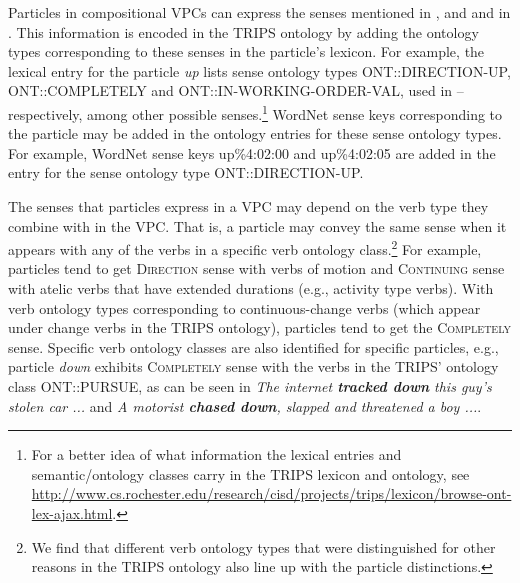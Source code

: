 \documentclass[output=paper
,modfonts
,nonflat]{langsci/langscibook}
\begin{document}
Particles in compositional VPCs can express the senses mentioned in , and  and in . This information is encoded in the TRIPS ontology by adding the ontology types corresponding to these senses in the particle's lexicon. For example, the lexical entry for the particle \textit{up} lists sense ontology types ONT::DIRECTION-UP, ONT::COMPLETELY and ONT::IN-WORKING-ORDER-VAL, used in -- respectively, among other possible senses.\footnote{For a better idea of what information the lexical entries and semantic/ontology classes carry in the TRIPS lexicon and ontology, see  \url{http://www.cs.rochester.edu/research/cisd/projects/trips/lexicon/browse-ont-lex-ajax.html}.} WordNet sense keys corresponding to the particle may be added in the ontology entries for these sense ontology types. For example, WordNet sense keys up\%4:02:00 and up\%4:02:05 are added in the entry for the sense ontology type ONT::DIRECTION-UP.

The senses that particles express in a VPC may depend on the verb type they combine with in the VPC. That is, a particle may convey the same sense when it appears with any of the verbs in a specific verb ontology class.\footnote{We find that different verb ontology types that were distinguished for other reasons in the TRIPS  ontology \citep{All07} also line up with the particle distinctions.} For example, particles tend to get \textsc{Direction} sense with verbs of motion and \textsc{Continuing} sense with atelic verbs that have extended durations (e.g., activity type verbs). With verb ontology types corresponding to continuous-change verbs (which appear under change verbs in the TRIPS ontology), particles tend to get the \textsc{Completely} sense. Specific verb ontology classes are also identified for specific particles, e.g., particle \textit{down} exhibits \textsc{Completely} sense with the verbs in the TRIPS' ontology class ONT::PURSUE, as can be seen in \textit{The internet \textbf{tracked down} this guy's stolen car ...}
and \textit{A motorist \textbf{chased down}, slapped and threatened a boy ...}.
\end{document}
